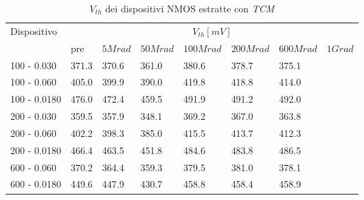 \documentclass[
	a4paper,
	cleardoublepage=empty,
	headings=twolinechapter,
	numbers=autoenddot,
]{scrbook}
\begin{document}
\begin{table}[H]
  \renewcommand{\arraystretch}{1.3}
  \begin{tabular}{m{2.1cm} m{0.8cm} m{1.1cm} m{1.3cm} m{1.5cm} m{1.5cm} m{1.5cm} m{1cm}}
    \toprule
    \multirow{2}{*}{Dispositivo} & \multicolumn{7}{c}{$V_{th} [mV] $}                                                                    \\
    \cmidrule{2-8}
                                 & pre                                & $5Mrad$ & $50Mrad$ & $100Mrad$ & $200Mrad$ & $600Mrad$ & $1Grad$ \\
    \midrule
    100 - 0.030                     & 371.3                              & 370.6   & 361.0    & 380.6     & 378.7     & 375.1     &         \\
    \hline
    100 - 0.060                     & 405.0                              & 399.9   & 390.0    & 419.8     & 418.8     & 414.0     &         \\
    \hline
    100 - 0.0180                    & 476.0                              & 472.4   & 459.5    & 491.9     & 491.2     & 492.0     &         \\
    \hline
    200 - 0.030                     & 359.5                              & 357.9   & 348.1    & 369.2     & 367.0     & 363.8     &         \\
    \hline
    200 - 0.060                     & 402.2                              & 398.3   & 385.0    & 415.5     & 413.7     & 412.3     &         \\
    \hline
    200 - 0.0180                    & 466.4                              & 463.5   & 451.8    & 484.6     & 483.8     & 486.5     &         \\
    \hline
    600 - 0.060                     & 370.2                              & 364.4   & 359.3    & 379.5     & 381.0     & 378.1     &         \\
    \hline
    600 - 0.0180                    & 449.6                              & 447.9   & 430.7    & 458.8     & 458.4     & 458.9     &         \\
    \bottomrule
  \end{tabular}
  \caption{$V_{th}$ dei dispositivi NMOS estratte con \emph{TCM}}
  \label{tab:VthTCMN}
\end{table}
\end{document}
